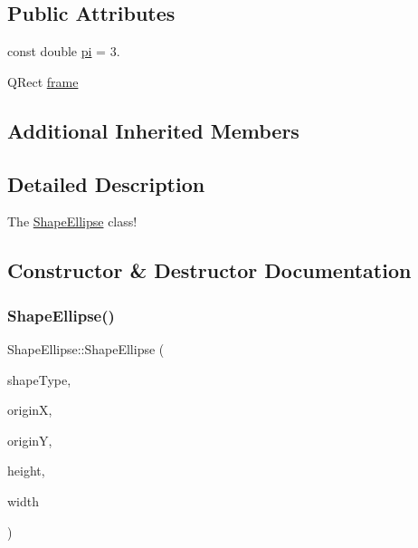 \subsection*{Public Attributes}
\begin{DoxyCompactItemize}
\item 
const double \mbox{\hyperlink{class_shape_ellipse_a8ee638d167c341015a7f0f82b7a8debb}{pi}} = 3.
\item 
Q\+Rect \mbox{\hyperlink{class_shape_ellipse_ac9feb0571e6f658866ab142643230081}{frame}}
\end{DoxyCompactItemize}
\subsection*{Additional Inherited Members}


\subsection{Detailed Description}
The \mbox{\hyperlink{class_shape_ellipse}{Shape\+Ellipse}} class! 

\subsection{Constructor \& Destructor Documentation}
\mbox{\label{class_shape_ellipse_a80f7ee6f65112d606b348d89366feeee}} 
\subsubsection{\texorpdfstring{ShapeEllipse()}{ShapeEllipse()}\hspace{0.1cm}{\footnotesize\ttfamily [1/2]}}
{\footnotesize\ttfamily Shape\+Ellipse\+::\+Shape\+Ellipse (\begin{DoxyParamCaption}\item[{\mbox{\hyperlink{class_i_shape_a8f50993477b5ddb44c0547ef3d547cdc}{Shape\+Type}}}]{shape\+Type,  }\item[{int}]{originX,  }\item[{int}]{originY,  }\item[{int}]{height,  }\item[{int}]{width }\end{DoxyParamCaption})}



